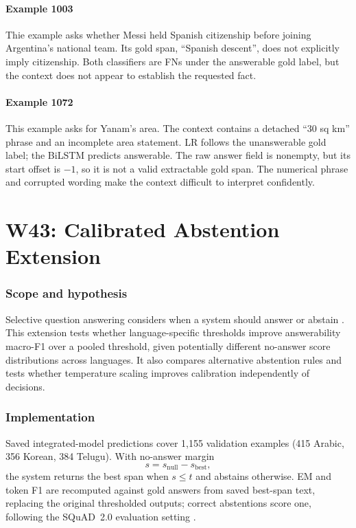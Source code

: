 \documentclass[11pt]{article}
\begin{document}
\paragraph{Example 1003} 
Thie example asks whether Messi held Spanish citizenship before joining Argentina's national team. Its gold span, ``Spanish descent'', does not explicitly imply citizenship. Both classifiers are FNs under the answerable gold label, but the context does not appear to establish the requested fact.

\paragraph{Example 1072} 
This example asks for Yanam's area. The context contains a detached ``30 sq km''
phrase and an incomplete area statement. LR follows the unanswerable gold label; the BiLSTM predicts answerable. The raw answer field is nonempty, but its start offset
is $-1$, so it is not a valid extractable gold span. The numerical phrase and corrupted wording make the context difficult to interpret confidently.

\section{W43: Calibrated Abstention Extension}

\subsubsection*{Scope and hypothesis}

\noindent
Selective question answering considers when a system should answer or abstain \cite{kamath2020selective}. This extension tests whether language-specific thresholds improve answerability macro-F1 over a pooled threshold, given potentially different no-answer score distributions across languages. It also compares alternative abstention rules and tests whether temperature scaling improves calibration independently of decisions.

\subsubsection*{Implementation}

\noindent
Saved integrated-model predictions cover 1,155 validation examples (415 Arabic, 356 Korean, 384 Telugu). With no-answer margin
\[
    s = s_{\mathrm{null}} - s_{\mathrm{best}},
\]
the system returns the best span when $s \leq t$ and abstains otherwise. EM and token F1 are recomputed against gold answers from saved best-span text, replacing the original thresholded outputs; correct abstentions score one, following the SQuAD~2.0 evaluation setting \cite{rajpurkar2018squad2}.
\end{document}
